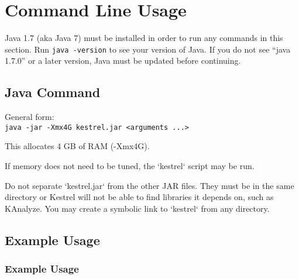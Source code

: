 
\newcommand{\optwidth}{0.15\textwidth}
\newcommand{\argwidth}{0.20\textwidth}
\newcommand{\dscwidth}{0.50\textwidth}
\newcommand{\defwidth}{0.15\textwidth}

\newcommand{\optbox}[1]{\parbox[t][][t]{\optwidth}{#1}\vspace{0.25em}}
\newcommand{\argbox}[1]{\parbox{\argwidth}{#1}}
\newcommand{\dscbox}[1]{\parbox{\dscwidth}{#1}}
\newcommand{\defbox}[1]{\parbox{\defwidth}{#1}}




\section{Command Line Usage}
\label{sec.cmdline}

Java 1.7 (aka Java 7) must be installed in order to run any commands in this section. Run \texttt{java -version} to see your version of Java. If you do not see ``java 1.7.0'' or a later version, Java must be updated before continuing.


\subsection{Java Command}
\label{sec.cmdline.javacommand}

General form:\\
\texttt{java -jar -Xmx4G kestrel.jar <arguments ...>}

This allocates 4 GB of RAM (-Xmx4G).

If memory does not need to be tuned, the `kestrel` script may be run.

Do not separate `kestrel.jar` from the other JAR files. They must be in the same directory or Kestrel will not be able to find libraries it depends on, such as KAnalyze. You may create a symbolic link to `kestrel` from any directory.


\subsection{Example Usage}
\label{sec.cmdline.example}


\subsubsection{Example Usage}
\label{sec.cmdline.count.egusage}

